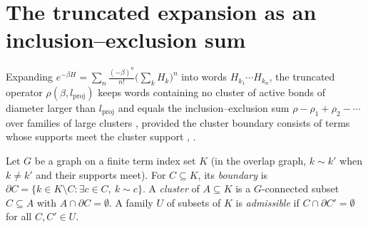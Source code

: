\section{The truncated expansion as an inclusion--exclusion sum}
\label{sec:hastings_cluster_truncation}


Expanding $e^{-\beta H}=\sum_n\frac{(-\beta)^n}{n!}\bigl(\sum_kH_k\bigr)^n$ into
words $H_{k_1}\cdots H_{k_n}$, the truncated operator
$\rho(\beta,l_{\mathrm{proj}})$ keeps words containing no cluster of active
bonds of diameter larger than $l_{\mathrm{proj}}$
\cite[lines 1090--1114]{Hastings2006Solving} and equals the inclusion--exclusion
sum $\rho-\rho_1+\rho_2-\cdots$ over families of large clusters
\cite[lines 1218--1224]{Hastings2006Solving}, provided the cluster boundary
consists of terms whose supports meet the cluster support
\cite[lines 1131--1134]{Hastings2006Solving},
\cite{gap:hastings05_cluster_boundary}.

\begin{definition}
    \label{def:hastings_cluster_of_terms}
    \leanok
    Let $G$ be a graph on a finite term index set $K$ (in the overlap graph,
    $k\sim k'$ when $k\ne k'$ and their supports meet). For $C\subseteq K$, its
    \emph{boundary} is $\partial C=\{k\in K\setminus C:\exists c\in C,\ k\sim c\}$.
    A \emph{cluster} of $A\subseteq K$ is a $G$-connected subset $C\subseteq A$
    with $A\cap\partial C=\emptyset$. A family $U$ of subsets of $K$ is
    \emph{admissible} if $C\cap\partial C'=\emptyset$ for all $C,C'\in U$.
\end{definition}

